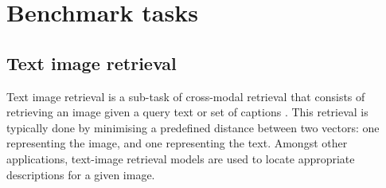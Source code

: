 \documentclass[10pt,twocolumn,letterpaper]{article}
\begin{document}
\begin{table}[htb]
  \vspace{1mm}
  \centering
    \caption{Statistics of the train test and validation splits.}
  \label{tab:table3}
\end{table}

\section{Benchmark tasks}
\label{sec:benchmark_task}
\subsection{Text image retrieval}\label{sec:benchmark_tir}


Text image retrieval is a sub-task of cross-modal retrieval that consists of retrieving an image given a query text or set of captions \cite{wang2019camp}. This retrieval is typically done by minimising a predefined distance between  two vectors: one representing the image, and one representing the text. Amongst other applications, text-image retrieval models are used to locate appropriate descriptions for a given image.
\end{document}
